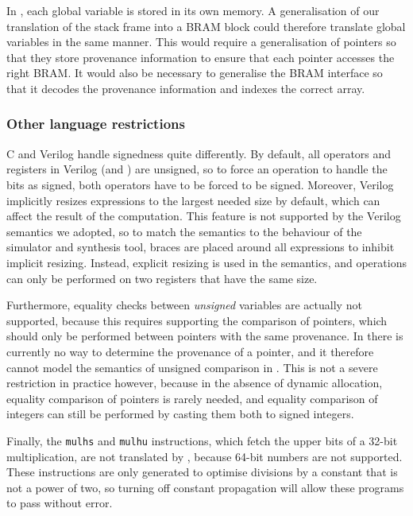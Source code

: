 In \compcert{}, each global variable is stored in its own memory.  A
generalisation of our translation of the stack frame into a \gls{BRAM} block could
therefore translate global variables in the same manner.  This would require a
generalisation of pointers so that they store provenance information to ensure
that each pointer accesses the right \gls{BRAM}. It would also be necessary to
generalise the \gls{BRAM} interface so that it decodes the provenance
information and indexes the correct array.

\subsubsection{Other language restrictions}

C and Verilog handle signedness quite differently. By default, all operators and
registers in Verilog (and \htl{}) are unsigned, so to force an operation to
handle the bits as signed, both operators have to be forced to be
signed. Moreover, Verilog implicitly resizes expressions to the largest needed
size by default, which can affect the result of the computation.  This feature
is not supported by the Verilog semantics we adopted, so to match the semantics
to the behaviour of the simulator and synthesis tool, braces are placed around
all expressions to inhibit implicit resizing.  Instead, explicit resizing is
used in the semantics, and operations can only be performed on two registers
that have the same size.

Furthermore, equality checks between \emph{unsigned} variables are actually not
supported, because this requires supporting the comparison of pointers, which
should only be performed between pointers with the same provenance.  In
\vericert{} there is currently no way to determine the provenance of a pointer,
and it therefore cannot model the semantics of unsigned comparison in
\compcert{}. This is not a severe restriction in practice however, because in
the absence of dynamic allocation, equality comparison of pointers is rarely
needed, and equality comparison of integers can still be performed by casting
them both to signed integers.

Finally, the \texttt{mulhs} and \texttt{mulhu} instructions, which fetch the
upper bits of a 32-bit multiplication, are not translated by \vericert{},
because 64-bit numbers are not supported. These instructions are only generated
to optimise divisions by a constant that is not a power of two, so turning off
constant propagation will allow these programs to pass without error.


